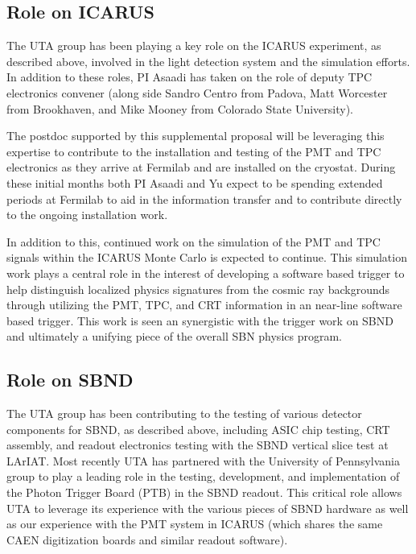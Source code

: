 \subsection*{Role on ICARUS}
The UTA group has been playing a key role on the ICARUS experiment, as described above, involved in the light detection system and the simulation efforts. In addition to these roles, PI Asaadi has taken on the role of deputy TPC electronics convener (along side Sandro Centro from Padova, Matt Worcester from Brookhaven, and Mike Mooney from Colorado State University). 

The postdoc supported by this supplemental proposal will be leveraging this expertise to contribute to the installation and testing of the PMT and TPC electronics as they arrive at Fermilab and are installed on the cryostat. During these initial months both PI Asaadi and Yu expect to be spending extended periods at Fermilab to aid in the information transfer and to contribute directly to the ongoing installation work.

In addition to this, continued work on the simulation of the PMT and TPC signals within the ICARUS Monte Carlo is expected to continue. This simulation work plays a central role in the interest of developing a software based trigger to help distinguish localized physics signatures from the cosmic ray backgrounds through utilizing the PMT, TPC, and CRT information in an near-line software based trigger. This work is seen an synergistic with the trigger work on SBND and ultimately a unifying piece of the overall SBN physics program.

\subsection*{Role on SBND}
The UTA group has been contributing to the testing of various detector components for SBND, as described above, including ASIC chip testing, CRT assembly, and readout electronics testing with the SBND vertical slice test at LArIAT. Most recently UTA has partnered with the University of Pennsylvania group to play a leading role in the testing, development, and implementation of the Photon Trigger Board (PTB) in the SBND readout. This critical role allows UTA to leverage its experience with the various pieces of SBND hardware as well as our experience with the PMT system in ICARUS (which shares the same CAEN digitization boards and similar readout software).


